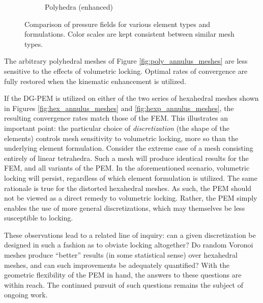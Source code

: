 \begin{figure}[!h]
\begin{subfigure}[b]{0.32\linewidth}
    			\caption{Polyhedra (enhanced) \label{fig:poly_fbar_pressure}}
    \end{subfigure} 
    \caption{Comparison of pressure fields for various element types and formulations. Color scales are kept consistent between similar mesh types.}
  \label{fig:twisting_annulus_stresses}
\end{figure}

The arbitrary polyhedral meshes of Figure \ref{fig:poly_annulus_meshes} are less sensitive to the effects of volumetric locking. Optimal rates of convergence are fully restored when the kinematic enhancement is utilized.

If the DG-PEM is utilized on either of the two series of hexahedral meshes shown in Figures \ref{fig:hex_annulus_meshes} and \ref{fig:hexp_annulus_meshes}, the resulting convergence rates match those of the FEM. This illustrates an important point: the particular choice of \textit{discretization} (the shape of the elements) controls mesh sensitivity to volumetric locking, more so than the underlying element formulation. Consider the extreme case of a mesh consisting entirely of linear tetrahedra. Such a mesh will produce identical results for the FEM, and all variants of the PEM. In the aforementioned scenario, volumetric locking will persist, regardless of which element formulation is utilized. The same rationale is true for the distorted hexahedral meshes. As such, the PEM should not be viewed as a direct remedy to volumetric locking. Rather, the PEM simply enables the use of more general discretizations, which may themselves be less susceptible to locking.

These observations lead to a related line of inquiry: can a given discretization be designed in such a fashion as to obviate locking altogether? Do random Voronoi meshes produce ``better'' results (in some statistical sense) over hexahedral meshes, and can such improvements be adequately quantified? With the geometric flexibility of the PEM in hand, the answers to these questions are within reach. The continued pursuit of such questions remains the subject of ongoing work.

%
%
%
%

